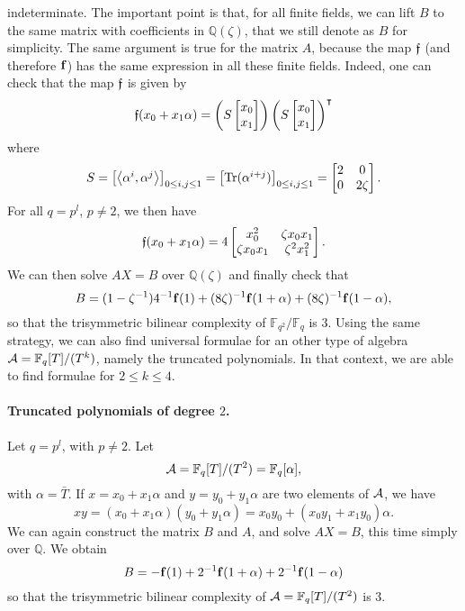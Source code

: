 \documentclass[11pt]{article}
\begin{document}
indeterminate. The important point is that, for all finite fields, we can lift
$B$ to the same matrix with coefficients in $\mathbb{Q}(\zeta)$, that we still
denote as $B$ for simplicity. The same argument is true for the matrix $A$, because the map
$\mathfrak{f}$ (and therefore $\mathbf{f}$) has the same expression in all these finite fields.
Indeed, one can check that the map $\mathfrak{f}$ is given by
\[
  \mathfrak{f}(x_0+x_1\alpha)=
  \left(S 
  \begin{bmatrix}
    x_0 \\
    x_1
  \end{bmatrix}\right)
  \left(S 
  \begin{bmatrix}
    x_0 \\
    x_1
  \end{bmatrix}\right)^\intercal
\]
where
\[
  S =
  \begin{bmatrix}
    \left\langle\alpha^i,\alpha^j\right\rangle
  \end{bmatrix}_{0\leq i, j\leq 1}
  =
  \begin{bmatrix}
    \operatorname{Tr}(\alpha^{i+j})
  \end{bmatrix}_{0\leq i, j\leq 1}
  =
  \begin{bmatrix}
   2 & 0 \\
   0 & 2\zeta
  \end{bmatrix}.
\]
For all $q=p^l$, $p\neq 2$, we then have
\[
  \mathfrak{f}(x_0+x_1\alpha) =
  4\begin{bmatrix}
   x_0^2 & \zeta x_0x_1 \\
   \zeta x_0 x_1 & \zeta^2 x_1^2
  \end{bmatrix}.
\]
We can then solve $AX=B$ over
$\mathbb{Q}(\zeta)$ and finally check that
\[
  B = (1-\zeta^{-1})4^{-1}\mathbf{f}(1) +
  (8\zeta)^{-1}\mathbf{f}(1+\alpha)+(8\zeta)^{-1}\mathbf{f}(1-\alpha),
\]
so that the trisymmetric bilinear complexity of
$\mathbb{F}_{q^2}/\mathbb{F}_{q}$ is $3$. Using the same strategy, we can also
find universal formulae for an other type of algebra $\mathcal{A} =
\mathbb{F}_{q}[T]/(T^k)$, namely the truncated polynomials. In that context, we
are able to find formulae for $2\leq k \leq 4$.
\paragraph{Truncated polynomials of degree $2$.} Let $q=p^l$, with $p\neq2$. Let
\[
  \mathcal{A} = \mathbb{F}_{q}[T]/(T^2) = \mathbb{F}_q[\alpha],
\]
with $\alpha=\bar T$. If $x =
x_0 + x_1\alpha$ and $y = y_0 + y_1\alpha$ are two elements of
$\mathcal{A}$, we have
\[
  xy = (x_0+x_1\alpha)(y_0+y_1\alpha)=x_0y_0+
  (x_0y_1+x_1y_0)\alpha.
\]
We can again construct the matrix $B$ and $A$, and solve $AX=B$, this time
simply over
$\mathbb{Q}$. We obtain
\[
  B = -\mathbf{f}(1) + 2^{-1}\mathbf{f}(1+\alpha)+2^{-1}\mathbf{f}(1-\alpha)
\]
so that the trisymmetric bilinear complexity of
$\mathcal{A}=\mathbb{F}_q[T]/(T^2)$ is $3$.
\end{document}
